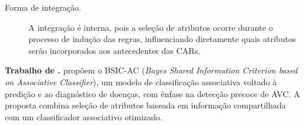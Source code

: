 \begin{description}
    \item[Forma de integração.] A integração é interna, pois a seleção de atributos ocorre durante o processo de indução das regras, influenciando diretamente quais atributos serão incorporados aos antecedentes das CARs.
\end{description}


\textbf{Trabalho de .} 
 propõem o BSIC-AC (\textit{Bayes Shared Information Criterion based on Associative Classifier}), um modelo de classificação associativa voltado à predição e ao diagnóstico de doenças, com ênfase na detecção precoce de AVC. A proposta combina seleção de atributos baseada em informação compartilhada com um classificador associativo otimizado.

